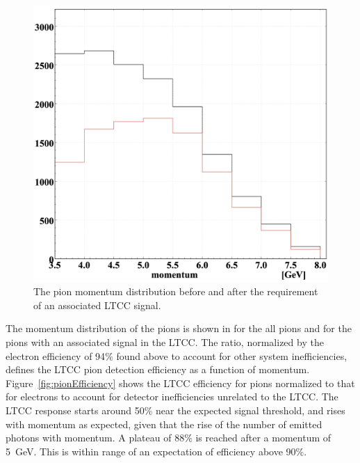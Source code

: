\begin{figure}
	\centering
	\includegraphics[width=0.98\columnwidth,keepaspectratio]{img/pionMomentum.png}
	\caption{The pion momentum distribution before and after the requirement of an associated LTCC signal. }
	\label{fig:pionMomentum}
\end{figure}

The momentum distribution of the pions is shown in  for the all pions and for the pions
with an associated signal in the LTCC. The ratio, normalized by the electron efficiency of 94$\%$ found above
to account for other system inefficiencies, defines the LTCC pion detection efficiency as a function of
momentum. Figure~\ref{fig:pionEfficiency} shows the LTCC efficiency for pions normalized to that for electrons
to account for detector inefficiencies unrelated to the LTCC. The LTCC response starts around 50$\%$ near
the expected signal threshold, and rises with momentum as expected, given that the rise of the number of emitted
photons with momentum. A plateau of 88$\%$ is reached after
a momentum of 5~GeV. This is within range of an expectation of efficiency above 90$\%$. 

